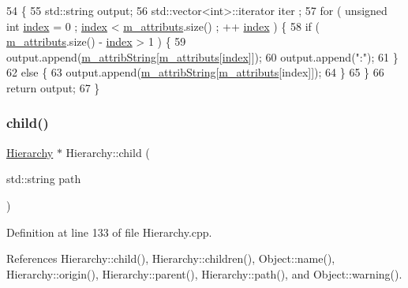 \begin{DoxyCode}
54                             \{
55   std::string output;
56   std::vector<int>::iterator iter ;
57   \textcolor{keywordflow}{for} ( \textcolor{keywordtype}{unsigned} \textcolor{keywordtype}{int} \hyperlink{namespaceimages_a54407fd574970b3178647ae096321a57}{index} = 0 ; \hyperlink{namespaceimages_a54407fd574970b3178647ae096321a57}{index} < \hyperlink{classAttrib_ac4bd58a0cc6b38a3b711d609a3d3aacc}{m\_attributs}.size() ; ++
      \hyperlink{namespaceimages_a54407fd574970b3178647ae096321a57}{index} ) \{
58     \textcolor{keywordflow}{if} ( \hyperlink{classAttrib_ac4bd58a0cc6b38a3b711d609a3d3aacc}{m\_attributs}.size() - \hyperlink{namespaceimages_a54407fd574970b3178647ae096321a57}{index} > 1 ) \{
59       output.append(\hyperlink{classAttrib_a3414521d7a82476e874b25a5407b5e63}{m\_attribString}[\hyperlink{classAttrib_ac4bd58a0cc6b38a3b711d609a3d3aacc}{m\_attributs}[\hyperlink{namespaceimages_a54407fd574970b3178647ae096321a57}{index}]]);
60       output.append(\textcolor{stringliteral}{":"});
61     \}
62     \textcolor{keywordflow}{else} \{
63       output.append(\hyperlink{classAttrib_a3414521d7a82476e874b25a5407b5e63}{m\_attribString}[\hyperlink{classAttrib_ac4bd58a0cc6b38a3b711d609a3d3aacc}{m\_attributs}[index]]);
64     \}
65   \}
66   \textcolor{keywordflow}{return} output;
67 \}
\end{DoxyCode}
\mbox{\label{classHierarchy_a1e207f973c694b538bf90107b4868817}} 
\subsubsection{\texorpdfstring{child()}{child()}}
{\footnotesize\ttfamily \hyperlink{classHierarchy}{Hierarchy} $\ast$ Hierarchy\+::child (\begin{DoxyParamCaption}\item[{std\+::string}]{path }\end{DoxyParamCaption})\hspace{0.3cm}{\ttfamily [inherited]}}



Definition at line 133 of file Hierarchy.\+cpp.



References Hierarchy\+::child(), Hierarchy\+::children(), Object\+::name(), Hierarchy\+::origin(), Hierarchy\+::parent(), Hierarchy\+::path(), and Object\+::warning().



